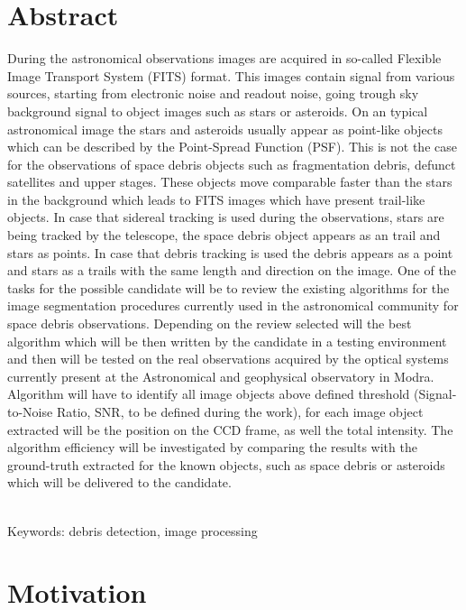 \documentclass[12pt, a4paper, oneside]{book}
\begin{document}
\chapter*{Abstract}\label{chap:abstract_en}
During the astronomical observations images are acquired in so-called Flexible Image Transport System (FITS) format. This images contain signal from various sources, starting from electronic noise and readout noise, going trough sky background signal to object images such as stars or asteroids. On an typical astronomical image the stars and asteroids usually appear as point-like objects which can be described by the Point-Spread Function (PSF). This is not the case for the observations of space debris objects such as fragmentation debris, defunct satellites and upper stages. These objects move comparable faster than the stars in the background which leads to FITS images which have present trail-like objects. In case that sidereal tracking is used during the observations, stars are being tracked by the telescope, the space debris object appears as an trail and stars as points. In case that debris tracking is used the debris appears as a point and stars as a trails with the same length and direction on the image. One of the tasks for the possible candidate will be to review the existing algorithms for the image segmentation procedures currently used in the astronomical community for space debris observations. Depending on the review selected will the best algorithm which will be then written by the candidate in a testing environment and then will be tested on the real observations acquired by the optical systems currently present at the Astronomical and geophysical observatory in Modra. Algorithm will have to identify all image objects above defined threshold (Signal-to-Noise Ratio, SNR, to be defined during the work), for each image object extracted will be the position on the CCD frame, as well the total intensity. The algorithm efficiency will be investigated by comparing the results with the ground-truth extracted for the known objects, such as space debris or asteroids which will be delivered to the candidate.


~\\
Keywords: debris detection, image processing
\vfill\eject

\tableofcontents

\mainmatter

\chapter{Motivation}
\end{document}
